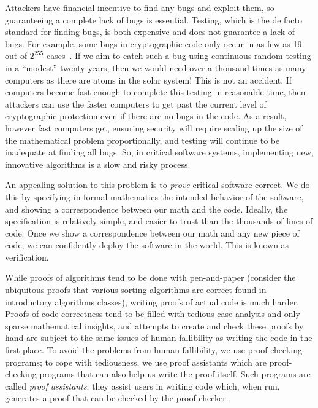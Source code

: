 Attackers have financial incentive to find any bugs and exploit them, so guaranteeing a complete lack of bugs is essential.
Testing, which is the de facto standard for finding bugs, is both expensive and does not guarantee a lack of bugs.
For example, some bugs in cryptographic code only occur in as few as 19 out of $2^{255}$ cases~\cite{curve25519-donna-commit-correct-bounds}.
If we aim to catch such a bug using continuous random testing in a ``modest'' twenty years, then we would need over a thousand times as many computers as there are atoms in the solar system!
This is not an accident.
If computers become fast enough to complete this testing in reasonable time, then attackers can use the faster computers to get past the current level of cryptographic protection even if there are no bugs in the code.
As a result, however fast computers get, ensuring security will require scaling up the size of the mathematical problem proportionally, and testing will continue to be inadequate at finding all bugs.
So, in critical software systems, implementing new, innovative algorithms is a slow and risky process.






An appealing solution to this problem is to \emph{prove} critical software correct.
We do this by specifying in formal mathematics the intended behavior of the software, and showing a correspondence between our math and the code.
Ideally, the specification is relatively simple, and easier to trust than the thousands of lines of code.
Once we show a correspondence between our math and any new piece of code, we can confidently deploy the software in the world.
This is known as verification.

While proofs of algorithms tend to be done with pen-and-paper (consider the ubiquitous proofs that various sorting algorithms are correct found in introductory algorithms classes), writing proofs of actual code is much harder.
Proofs of code-correctness tend to be filled with tedious case-analysis and only sparse mathematical insights, and attempts to create and check these proofs by hand are subject to the same issues of human fallibility as writing the code in the first place.
To avoid the problems from human fallibility, we use proof-checking programs; to cope with tediousness, we use proof assistants which are proof-checking programs that can also help us write the proof itself.
Such programs are called \emph{proof assistants}; they assist users in writing code which, when run, generates a proof that can be checked by the proof-checker.

